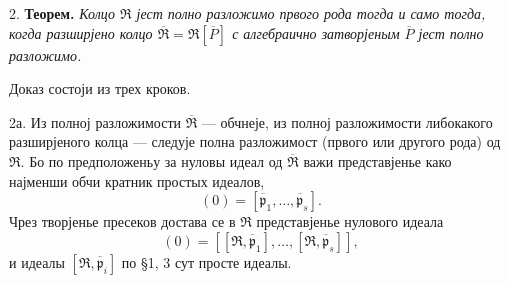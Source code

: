\documentclass[11pt]{article}
\begin{document}
\setcounter{footnote}{22}

2. \textbf{Теорем.} \emph{Колцо $\mathfrak R$ јест полно разложимо првого рода тогда и само тогда, когда разширјено колцо $\overline{\mathfrak R}=\mathfrak R[\overline P]$ с алгебраично затворјеным $\overline P$ јест полно разложимо.}

Доказ состоји из трех кроков.

2а. Из полној разложимости $\overline{\mathfrak R}$ --- обчнеје, из полној разложимости либокакого разширјеного колца --- следује полна разложимост (првого или другого рода) од $\mathfrak R$. Бо по предположеньу за нуловы идеал од $\overline{\mathfrak R}$ важи представјенье како најменши обчи кратник простых идеалов,
\[
        (0)=[\overline{\mathfrak p}_1,\ldots,\overline{\mathfrak p}_s].
\]
Чрез творјенье пресеков достава се в $\mathfrak R$ представјенье нулового идеала
\[
        (0)=[[\mathfrak R,\overline{\mathfrak p}_1],\ldots,[\mathfrak R,\overline{\mathfrak p}_s]],
\]
и идеалы $[\mathfrak R,\overline{\mathfrak p}_i]$ по \S 1, 3 сут просте идеалы.
\end{document}
